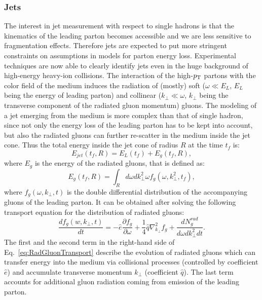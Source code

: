 \subsubsection{Jets}
The interest in jet measurement with respect to single hadrons is that
the kinematics of the leading parton becomes accessible and we are 
less sensitive to fragmentation effects. Therefore jets are expected to put 
more stringent constraints on assumptions in models for parton energy loss. 
Experimental techniques are now able to clearly identify jets 
even in the huge background of high-energy heavy-ion collisions. 
The interaction of the high-$p_{\rm T}$ partons with the color field of the medium
 induces the radiation of (mostly) soft ($\omega \ll E_{L}$, $E_L$ being the 
 energy of leading parton) and collinear ($k_{\perp} \ll \omega$, $k_{\perp}$ being
 the transverse component of the radiated gluon momentum) gluons. The 
 modeling of a jet emerging from the medium is more complex than that of
  single hadron, since not only the energy loss of the leading parton has to be 
  kept into account, but also the radiated gluons can further re-scatter in the 
  medium inside the jet cone. Thus the total energy inside the jet cone 
  of radius $R$ at the time $t_f$ is:
\begin{equation}
\label{eq:EnergyJet}
E_{jet}(t_f,R) = E_L(t_f) +E_g(t_f,R),
\end{equation}
where $E_g$ is the energy of the radiated gluons, that is defined as:
\begin{equation}
\label{eq:Eg}
E_g(t_f,R) = \int_R d\omega dk^2_\perp \omega f_g(\omega,k^2_\perp,t_f),
\end{equation}
where $f_g(\omega,k_{\perp},t)$ is the double differential distribution of 
the accompanying gluons of the leading parton. It can be obtained after solving 
the following transport equation for the distribution of radiated gluons:
\begin{equation}
\label{eq:RadGluonTransport}
\frac{df_g(w,k_{\perp},t)}{dt} = -\hat{e}\frac{\partial f_g}{\partial \omega} + \frac{1}{4}\hat{q}\nabla^2_{k_{\perp}}f_g + \frac{dN^{rad}_g}{d\omega dk^2_{\perp} dt}.
\end{equation}
The first and the second term in the right-hand side of Eq.~\ref{eq:RadGluonTransport} 
describe the evolution of radiated gluons which can transfer energy 
into the medium via collisional processes (controlled by coefficient 
$\hat{e}$) and accumulate transverse momentum $k_\perp$ 
(coefficient $\hat{q}$). The last term accounts for additional gluon 
radiation coming from emission of the leading parton.\\
